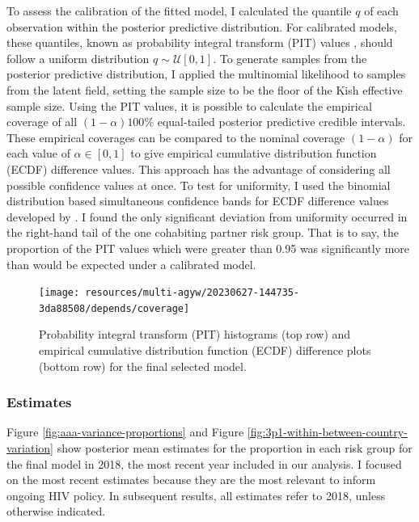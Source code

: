 \documentclass[a4paper, nobind]{templates/ociamthesis}
\begin{document}
To assess the calibration of the fitted model, I calculated the quantile \(q\) of each observation within the posterior predictive distribution.
For calibrated models, these quantiles, known as probability integral transform (PIT) values \autocite{dawid1984present,bosse2022scoringutils}, should follow a uniform distribution \(q \sim \mathcal{U}[0, 1]\).
To generate samples from the posterior predictive distribution, I applied the multinomial likelihood to samples from the latent field, setting the sample size to be the floor of the Kish effective sample size.
Using the PIT values, it is possible to calculate the empirical coverage of all \((1 - \alpha)100\)\% equal-tailed posterior predictive credible intervals.
These empirical coverages can be compared to the nominal coverage \((1 - \alpha)\) for each value of \(\alpha \in [0, 1]\) to give empirical cumulative distribution function (ECDF) difference values.
This approach has the advantage of considering all possible confidence values at once.
To test for uniformity, I used the binomial distribution based simultaneous confidence bands for ECDF difference values developed by \textcite{sailynoja2021graphical}.
I found the only significant deviation from uniformity occurred in the right-hand tail of the one cohabiting partner risk group.
That is to say, the proportion of the PIT values which were greater than 0.95 was significantly more than would be expected under a calibrated model.



\begin{figure}
\texttt{[image: resources/multi-agyw/20230627-144735-3da88508/depends/coverage]} \caption{Probability integral transform (PIT) histograms (top row) and empirical cumulative distribution function (ECDF) difference plots (bottom row) for the final selected model.}\label{fig:coverage}
\end{figure}

\hypertarget{estimates}{%
\subsubsection{Estimates}\label{estimates}}

Figure \ref{fig:aaa-variance-proportions} and Figure \ref{fig:3p1-within-between-country-variation} show posterior mean estimates for the proportion in each risk group for the final model in 2018, the most recent year included in our analysis.
I focused on the most recent estimates because they are the most relevant to inform ongoing HIV policy.
In subsequent results, all estimates refer to 2018, unless otherwise indicated.
\end{document}
